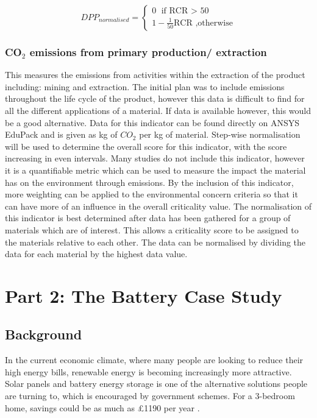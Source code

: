 \documentclass{article}
\begin{document}
\begin{equation} \label{eq:10}
DPP_{normalised} = \left\{\begin{matrix} 0 \text{ if RCR $>$ 50}
\\1-\frac{1}{50} \text{RCR} \text{ ,otherwise}

\end{matrix}\right.
\end{equation}

\subsubsection{CO$_{2}$ emissions from primary production/ extraction} 

This measures the emissions from activities within the extraction of the product including: mining and extraction. The initial plan was to include emissions throughout the life cycle of the product, however this data is difficult to find for all the different applications of a material. If data is available however, this would be a good alternative. Data for this indicator can be found directly on ANSYS EduPack and is given as kg of $CO_{2}$ per kg of material. Step-wise normalisation will be used to determine the overall score for this indicator, with the score increasing in even intervals. Many studies do not include this indicator, however it is a quantifiable metric which can be used to measure the impact the material has on the environment through emissions. By the inclusion of this indicator, more weighting can be applied to the environmental concern criteria so that it can have more of an influence in the overall criticality value. The normalisation of this indicator is best determined after data has been gathered for a group of materials which are of interest. This allows a criticality score to be assigned to the materials relative to each other. The data can be normalised by dividing the data for each material by the highest data value. 

\section{Part 2: The Battery Case Study}

\subsection{Background}

In the current economic climate, where many people are looking to reduce their high energy bills, renewable energy is becoming increasingly more attractive. Solar panels and battery energy storage is one of the alternative solutions people are turning to, which is encouraged by government schemes. For a 3-bedroom home, savings could be as much as £1190 per year \cite{solarsavings}. 
\end{document}
